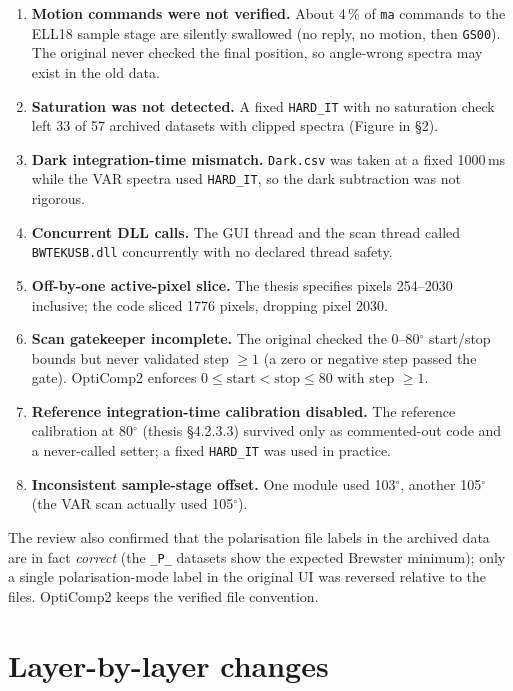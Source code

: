 \documentclass[11pt]{article}
\newcommand{\code}[1]{\texttt{\small #1}}
\begin{document}
\begin{enumerate}[label=\textbf{R\arabic*.}]
\item \textbf{Motion commands were not verified.} About 4\,\% of \code{ma} commands to the ELL18
sample stage are silently swallowed (no reply, no motion, then \code{GS00}). The original never
checked the final position, so angle-wrong spectra may exist in the old data.
\item \textbf{Saturation was not detected.} A fixed \code{HARD\_IT} with no saturation check left
33 of 57 archived datasets with clipped spectra (Figure in \S2).
\item \textbf{Dark integration-time mismatch.} \code{Dark.csv} was taken at a fixed 1000\,ms while
the VAR spectra used \code{HARD\_IT}, so the dark subtraction was not rigorous.
\item \textbf{Concurrent DLL calls.} The GUI thread and the scan thread called \code{BWTEKUSB.dll}
concurrently with no declared thread safety.
\item \textbf{Off-by-one active-pixel slice.} The thesis specifies pixels 254--2030 inclusive; the
code sliced 1776 pixels, dropping pixel 2030.
\item \textbf{Scan gatekeeper incomplete.} The original checked the 0--80$^\circ$ start/stop bounds
but never validated step $\ge 1$ (a zero or negative step passed the gate). OptiComp2 enforces
$0 \le \text{start} < \text{stop} \le 80$ with step $\ge 1$.
\item \textbf{Reference integration-time calibration disabled.} The reference calibration at
80$^\circ$ (thesis \S4.2.3.3) survived only as commented-out code and a never-called setter; a fixed
\code{HARD\_IT} was used in practice.
\item \textbf{Inconsistent sample-stage offset.} One module used 103$^\circ$, another 105$^\circ$
(the VAR scan actually used 105$^\circ$).
\end{enumerate}

The review also confirmed that the polarisation file labels in the archived data are in fact
\emph{correct} (the \code{\_P\_} datasets show the expected Brewster minimum); only a single
polarisation-mode label in the original UI was reversed relative to the files. OptiComp2 keeps the
verified file convention.

\section{Layer-by-layer changes}
\end{document}
